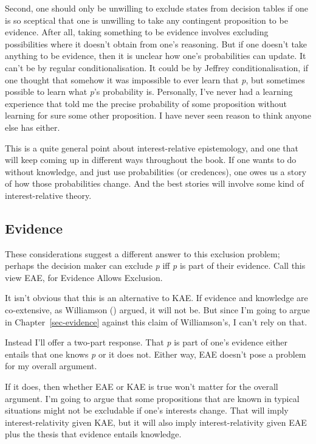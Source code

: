 \documentclass[
  12pt,
  letterpaper,
]{scrbook}
\begin{document}
Second, one should only be unwilling to exclude states from decision
tables if one is so sceptical that one is unwilling to take any
contingent proposition to be evidence. After all, taking something to be
evidence involves excluding possibilities where it doesn't obtain from
one's reasoning. But if one doesn't take anything to be evidence, then
it is unclear how one's probabilities can update. It can't be by regular
conditionalisation. It could be by Jeffrey conditionalisation, if one
thought that somehow it was impossible to ever learn that \emph{p}, but
sometimes possible to learn what \emph{p}'s probability is. Personally,
I've never had a learning experience that told me the precise
probability of some proposition without learning for sure some other
proposition. I have never seen reason to think anyone else has either.

This is a quite general point about interest-relative epistemology, and
one that will keep coming up in different ways throughout the book. If
one wants to do without knowledge, and just use probabilities (or
credences), one owes us a story of how those probabilities change. And
the best stories will involve some kind of interest-relative theory.

\subsection{Evidence}\label{sec-kae-evidence}

These considerations suggest a different answer to this exclusion
problem; perhaps the decision maker can exclude \emph{p} iff \emph{p} is
part of their evidence. Call this view EAE, for Evidence Allows
Exclusion.

It isn't obvious that this is an alternative to KAE. If evidence and
knowledge are co-extensive, as Williamson
() argued, it will not be. But since
I'm going to argue in Chapter~\ref{sec-evidence} against this claim of
Williamson's, I can't rely on that.

Instead I'll offer a two-part response. That \emph{p} is part of one's
evidence either entails that one knows \emph{p} or it does not. Either
way, EAE doesn't pose a problem for my overall argument.

If it does, then whether EAE or KAE is true won't matter for the overall
argument. I'm going to argue that some propositions that are known in
typical situations might not be excludable if one's interests change.
That will imply interest-relativity given KAE, but it will also imply
interest-relativity given EAE plus the thesis that evidence entails
knowledge.
\end{document}
